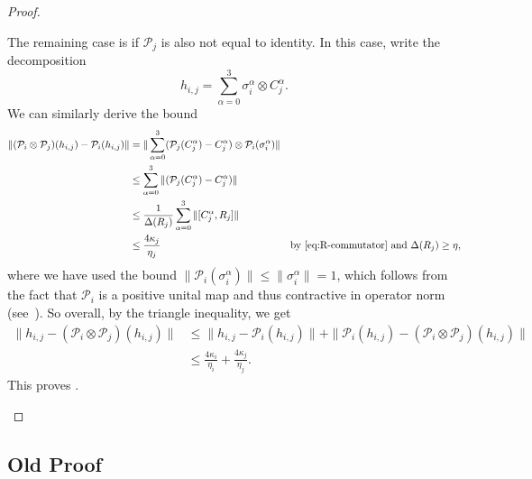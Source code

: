 \documentclass[11pt]{article}
\theoremstyle{plain}
\newcommand{\IslamNote}[1]{\textcolor{orange}{(Islam: #1)}}
\newcommand{\IslamNote}[1]{}
\renewcommand{\cP}{\mathcal{P}}
\begin{document}
\begin{proof}
\begin{enumerate}
The remaining case is if $\cP_j$ is also not equal to identity. In this case, write the decomposition
\[ h_{i,j} = \sum_{\alpha=0}^{3} \sigma_i^\alpha \otimes C_j^\alpha. \]
We can similarly derive the bound
\begin{align}
    \| (\cP_i \otimes \cP_j)(h_{i,j}) - \cP_i(h_{i,j}) \| &= \| \sum_{\alpha =0}^3 (\cP_j(C_j^\alpha) - C_j^\alpha) \otimes \cP_i(\sigma_i^\alpha) \| \\
    &\leq  \sum_{\alpha =0}^3 \| (\cP_j(C_j^\alpha) - C_j^\alpha) \| \\
    &\leq \frac{1}{\Delta(R_j)} \sum_{\alpha =0}^3 \| [C_j^\alpha, R_j] \| \\
    &\leq \frac{4\kappa_j}{\eta_j} & \text{by \Cref{eq:R-commutator} and } \Delta(R_j) \geq \eta,
\end{align}
where we have used the bound $\| \cP_i(\sigma_i^\alpha) \| \leq \| \sigma_i^\alpha \| = 1$, which follows from the fact that $\cP_i$ is a positive unital map and thus contractive in operator norm (see~\cite[Theorem~6.12]{Watrous_2018}). 
So overall, by the triangle inequality, we get
\begin{align}
    \| h_{i,j} - (\cP_i \otimes \cP_j)(h_{i,j})  \| &\leq \| h_{i,j} - \cP_i(h_{i,j}) \| + \| \cP_i(h_{i,j}) - (\cP_i \otimes \cP_j)(h_{i,j}) \| \\
    &\leq \frac{4\kappa_i}{\eta_i} + \frac{4\kappa_j}{\eta_j}.
\end{align}
This proves .
\end{enumerate}
\end{proof}


\iffalse
\newpage
\subsection{Old Proof}


\end{document}
